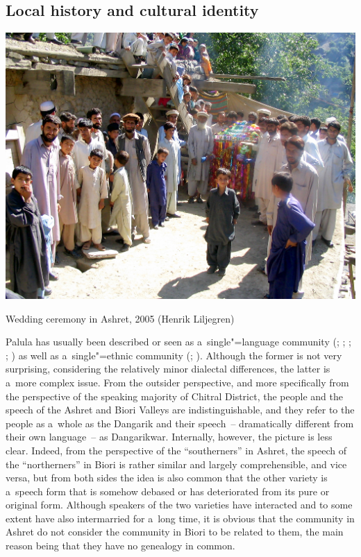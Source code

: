 \subsection{Local history and cultural identity}\label{Local history and cultural identity}
\label{subsec:1-2-3}
\begin{photofigure}[b]
 \includegraphics[width=\textwidth]{photos/Photo02--WeddingAshret.JPG}
\caption{Wedding ceremony in Ashret, 2005 (Henrik Liljegren)}
\label{fig:1:weddingphoto}
\end{photofigure}


Palula has usually been described or seen as a~single"=language community (\citealt[7]{morgenstierne1941}; \citealt[67]{decker1992a}; \citeyear[160]{decker1996}; \citealt[21]{masica1991}; \citealt[253, 258]{strand2001}) as well as a~single"=ethnic community (\citealt[79--143]{cacopardo2001}; \citealt[5]{akhunzadaliljegren2009}). Although the former is not very surprising, considering the relatively minor dialectal differences, the latter is a~more complex issue. From the outsider perspective, and more specifically from the perspective of the \iliKhowar speaking majority of Chitral District, the people and the speech of the Ashret and Biori Valleys are indistinguishable, and they refer to the people as a~whole as the Dangarik and their speech~-- dramatically different from their own language~-- as Dangarikwar. Internally, however, the picture is less clear. Indeed, from the perspective of the ``southerners'' in Ashret, the speech of the ``northerners'' in Biori is rather similar and largely comprehensible, and vice versa, but from both sides the idea is also common that the other variety is a~speech form that is somehow debased or has deteriorated from its pure or original form. Although speakers of the two varieties have interacted and to some extent have also intermarried for a~long time, it is obvious that the community in Ashret do not consider the community in Biori to be related to them, the main reason being that they have no genealogy in common. 

